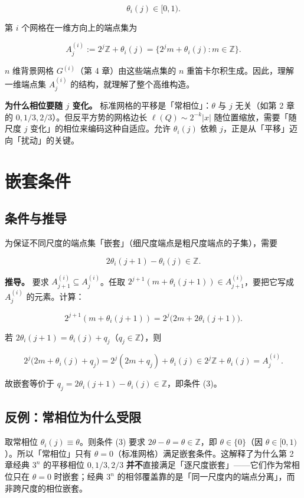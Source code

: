 \documentclass[a4paper,11pt,openany]{ctexbook}
\numberwithin{equation}{chapter}
\numberwithin{figure}{chapter}
\numberwithin{table}{chapter}
\begin{document}
$$\theta_i(j)\in[0,1).$$

第 $i$ 个网格在一维方向上的端点集为

$$A_j^{(i)}:=2^j\mathbb Z+\theta_i(j)=\{2^j m+\theta_i(j):m\in\mathbb Z\}.$$

$n$ 维背景网格 $G^{(i)}$（第 4 章）由这些端点集的 $n$ 重笛卡尔积生成。因此，理解一维端点集 $A_j^{(i)}$ 的结构，就理解了整个高维构造。

\textbf{为什么相位要随 $j$ 变化。} 标准网格的平移是「常相位」：$\theta$ 与 $j$ 无关（如第 2 章的 $0,1/3,2/3$）。但反平方势的网格边长 $\ell(Q)\sim2^{-k}|x|$ 随位置缩放，需要「随尺度 $j$ 变化」的相位来编码这种自适应。允许 $\theta_i(j)$ 依赖 $j$，正是从「平移」迈向「扰动」的关键。

\section{嵌套条件}

\subsection{条件与推导}

为保证不同尺度的端点集「嵌套」（细尺度端点是粗尺度端点的子集），需要

$$2\theta_i(j+1)-\theta_i(j)\in\mathbb Z .$$

\textbf{推导。} 要求 $A_{j+1}^{(i)}\subseteq A_j^{(i)}$。任取 $2^{j+1}(m+\theta_i(j+1))\in A_{j+1}^{(i)}$，要把它写成 $A_j^{(i)}$ 的元素。计算：

$$2^{j+1}(m+\theta_i(j+1))=2^j\bigl(2m+2\theta_i(j+1)\bigr).$$

若 $2\theta_i(j+1)=\theta_i(j)+q_j$（$q_j\in\mathbb Z$），则

$$2^j\bigl(2m+\theta_i(j)+q_j\bigr)=2^j(2m+q_j)+\theta_i(j)\in 2^j\mathbb Z+\theta_i(j)=A_j^{(i)}.$$

故嵌套等价于 $q_j=2\theta_i(j+1)-\theta_i(j)\in\mathbb Z$，即条件 (3)。

\subsection{反例：常相位为什么受限}

取常相位 $\theta_i(j)\equiv\theta$。则条件 (3) 要求 $2\theta-\theta=\theta\in\mathbb Z$，即 $\theta\in\{0\}$（因 $\theta\in[0,1)$）。所以「常相位」只有 $\theta=0$（标准网格）满足嵌套条件。这解释了为什么第 2 章经典 $3^n$ 的平移相位 $0,1/3,2/3$ \textbf{并不}直接满足「逐尺度嵌套」——它们作为常相位只在 $\theta=0$ 时嵌套；经典 $3^n$ 的相邻覆盖靠的是「同一尺度内的端点分离」，而非跨尺度的相位嵌套。
\end{document}
